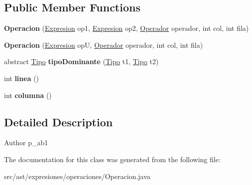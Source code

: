 \subsection*{Public Member Functions}
\begin{DoxyCompactItemize}
\item 
\mbox{\label{classast_1_1expresiones_1_1operaciones_1_1_operacion_a9ba85d4f6d374c3bc903507e795da4b3}} 
{\bfseries Operacion} (\mbox{\hyperlink{interfaceast_1_1_expresion}{Expresion}} op1, \mbox{\hyperlink{interfaceast_1_1_expresion}{Expresion}} op2, \mbox{\hyperlink{enumast_1_1expresiones_1_1operaciones_1_1_operacion_1_1_operador}{Operador}} operador, int col, int fila)
\item 
\mbox{\label{classast_1_1expresiones_1_1operaciones_1_1_operacion_a7b684f5095981b6fa965e77262a5aacd}} 
{\bfseries Operacion} (\mbox{\hyperlink{interfaceast_1_1_expresion}{Expresion}} opU, \mbox{\hyperlink{enumast_1_1expresiones_1_1operaciones_1_1_operacion_1_1_operador}{Operador}} operador, int col, int fila)
\item 
\mbox{\label{classast_1_1expresiones_1_1operaciones_1_1_operacion_aa445579ac0c73cfbfb07b9d27e59c059}} 
abstract \mbox{\hyperlink{classentorno_1_1_tipo}{Tipo}} {\bfseries tipo\+Dominante} (\mbox{\hyperlink{classentorno_1_1_tipo}{Tipo}} t1, \mbox{\hyperlink{classentorno_1_1_tipo}{Tipo}} t2)
\item 
\mbox{\label{classast_1_1expresiones_1_1operaciones_1_1_operacion_a0e6c9445b5becf5a531128563b3ef77e}} 
int {\bfseries linea} ()
\item 
\mbox{\label{classast_1_1expresiones_1_1operaciones_1_1_operacion_a5920863beab978a6122303148b3b3b8f}} 
int {\bfseries columna} ()
\end{DoxyCompactItemize}


\subsection{Detailed Description}
\begin{DoxyAuthor}{Author}
p\+\_\+ab1 
\end{DoxyAuthor}


The documentation for this class was generated from the following file\+:\begin{DoxyCompactItemize}
\item 
src/ast/expresiones/operaciones/Operacion.\+java\end{DoxyCompactItemize}
